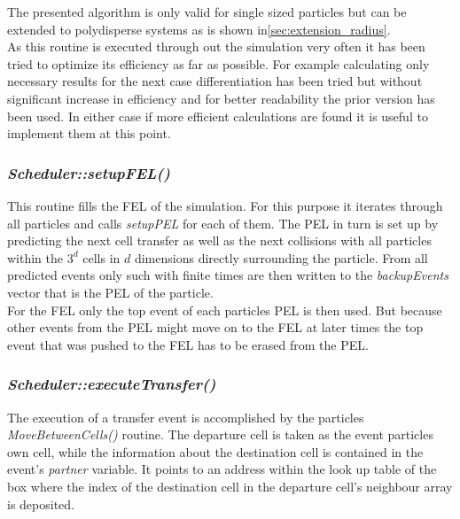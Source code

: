 The presented algorithm is only valid for single sized particles but can be extended to polydisperse systems as is shown in\autoref{sec:extension_radius}.\\

As this routine is executed through out the simulation very often it has been tried to optimize its efficiency as far as possible. For example calculating only necessary results for the next case differentiation has been tried but without significant increase in efficiency and for better readability the prior version has been used. In either case if more efficient calculations are found it is useful to implement them at this point.\\   

\subsubsection{\quad \textit{Scheduler::setupFEL()}}
This routine fills the FEL of the simulation. For this purpose it iterates through all particles and calls \textit{setupPEL} for each of them. The PEL in turn is set up by predicting the next cell transfer as well as the next collisions with all particles within the $3^d$ cells in $d$ dimensions directly surrounding the particle. From all predicted events only such with finite times are then written to the \textit{backupEvents} vector that is the PEL of the particle.\\
For the FEL only the top event of each particles PEL is then used. But because other events from the PEL might move on to the FEL at later times the top event that was pushed to the FEL has to be erased from the PEL.\\

\subsubsection{\quad \textit{Scheduler::executeTransfer()}}
The execution of a transfer event is accomplished by the particles \textit{MoveBetweenCells()} routine. The departure cell is taken as the event particles own cell, while the information about the destination cell is contained in the event's \textit{partner} variable. It points to an address within the look up table of the box where the index of the destination cell in the departure cell's neighbour array is deposited.\\

